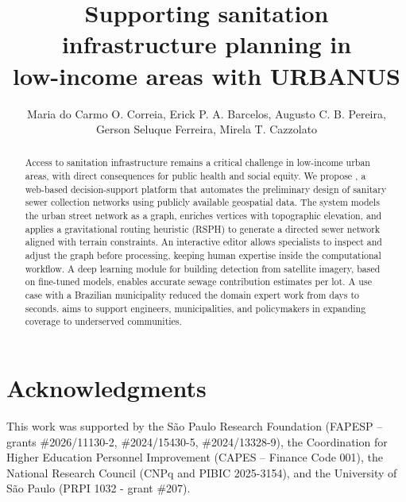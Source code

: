 \documentclass[12pt]{article}
\title{Supporting sanitation infrastructure planning in\\low-income areas with URBANUS}
\author{Maria do Carmo O. Correia\inst{1,2}, Erick P. A. Barcelos\inst{1},
    Augusto C. B. Pereira\inst{1},\\
    Gerson Seluque Ferreira\inst{2}, Mirela T. Cazzolato\inst{1}}
\begin{document}
 
 
\maketitle

\begin{abstract}
Access to sanitation infrastructure remains a critical challenge in low-income urban areas, with direct consequences for public health and social equity.
We propose \method, a web-based decision-support platform that automates the preliminary design of sanitary sewer collection networks using publicly available geospatial data.
The system models the urban street network as a graph, enriches vertices with topographic elevation, and applies a gravitational routing heuristic (RSPH) to generate a directed sewer network aligned with terrain constraints.
An interactive editor allows specialists to inspect and adjust the graph before processing, keeping human expertise inside the computational workflow.
A deep learning module for building detection from satellite imagery, based on fine-tuned models, enables accurate sewage contribution estimates per lot.
A use case with a Brazilian municipality reduced the domain expert work from days to seconds.
\method aims to support engineers, municipalities, and policymakers in expanding coverage to underserved communities.
\end{abstract}








\section*{Acknowledgments}

This work was supported by the São Paulo Research Foundation (FAPESP -- grants \#2026/11130-2, \#2024/15430-5, \#2024/13328-9), the Coordination for Higher Education Personnel Improvement (CAPES -- Finance Code 001), the National Research Council (CNPq and PIBIC 2025-3154), and the University of São Paulo (PRPI 1032 - grant \#207). 



\end{document}
